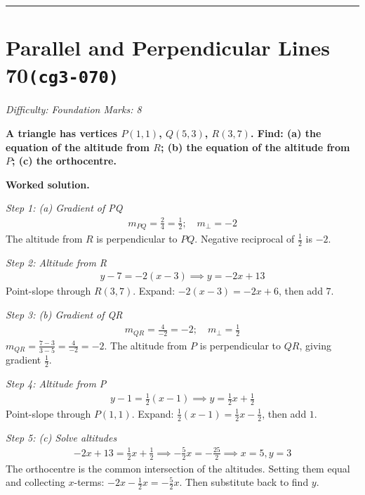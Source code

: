 \documentclass[11pt]{article}
\newcommand{\question}[1]{\par\medskip\noindent\textbf{#1}\par}
\begin{document}
\medskip\hrule

\section*{Parallel and Perpendicular Lines 70\quad\small\texttt{(cg3-070)}}
\textit{Difficulty: Foundation \quad\textbar\quad Marks: 8}

\question{A triangle has vertices \( P(1, 1) \), \( Q(5, 3) \), \( R(3, 7) \). Find: (a) the equation of the altitude from \( R \); (b) the equation of the altitude from \( P \); (c) the orthocentre.}

\textbf{Worked solution.}

\textit{Step 1: (a) Gradient of PQ}
\[\begin{gathered}
m_{PQ} = \frac{2}{4} = \frac{1}{2}; \quad m_{\perp} = -2
\end{gathered}\]
The altitude from \( R \) is perpendicular to \( PQ \). Negative reciprocal of \( \tfrac{1}{2} \) is \( -2 \).

\textit{Step 2: Altitude from R}
\[\begin{gathered}
y - 7 = -2(x - 3) \implies y = -2x + 13
\end{gathered}\]
Point-slope through \( R(3, 7) \). Expand: \( -2(x-3) = -2x + 6 \), then add \( 7 \).

\textit{Step 3: (b) Gradient of QR}
\[\begin{gathered}
m_{QR} = \frac{4}{-2} = -2; \quad m_{\perp} = \frac{1}{2}
\end{gathered}\]
\( m_{QR} = \tfrac{7 - 3}{3 - 5} = \tfrac{4}{-2} = -2 \). The altitude from \( P \) is perpendicular to \( QR \), giving gradient \( \tfrac{1}{2} \).

\textit{Step 4: Altitude from P}
\[\begin{gathered}
y - 1 = \frac{1}{2}(x - 1) \implies y = \frac{1}{2}x + \frac{1}{2}
\end{gathered}\]
Point-slope through \( P(1, 1) \). Expand: \( \tfrac{1}{2}(x - 1) = \tfrac{1}{2}x - \tfrac{1}{2} \), then add \( 1 \).

\textit{Step 5: (c) Solve altitudes}
\[\begin{gathered}
-2x + 13 = \frac{1}{2}x + \frac{1}{2} \implies -\frac{5}{2}x = -\frac{25}{2} \implies x = 5, y = 3
\end{gathered}\]
The orthocentre is the common intersection of the altitudes. Setting them equal and collecting \( x \)-terms: \( -2x - \tfrac{1}{2}x = -\tfrac{5}{2}x \). Then substitute back to find \( y \).
\end{document}
